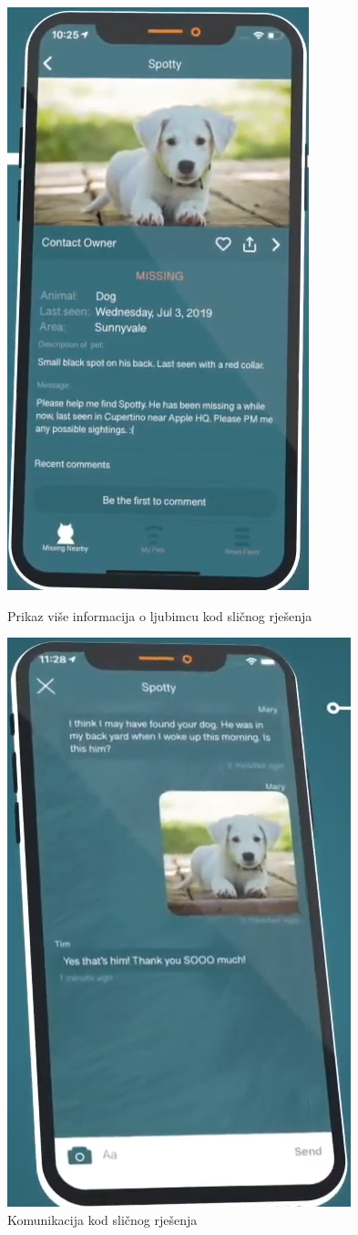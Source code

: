 		\begin{figure}[H]
			\centering
			\begin{minipage}{.5\textwidth}
	 			 \centering
				  \includegraphics[width=.4\linewidth]{slike/viseInformacija.PNG}
				  \caption{Prikaz više informacija o ljubimcu kod sličnog rješenja}
				  \label{fig:slika2}
			\end{minipage}%
			\begin{minipage}{.5\textwidth}
				  \centering
				  \includegraphics[width=.5\linewidth]{slike/Komunikacija.PNG}
				  \caption{Komunikacija kod sličnog rješenja}
				  \label{fig:slika3}
			\end{minipage}
		\end{figure}

